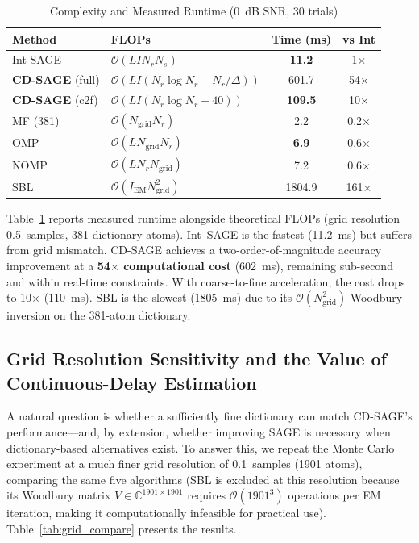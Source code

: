 \documentclass[a4paper,fleqn]{cas-dc}
\newcommand{\bigO}{\mathcal{O}}
\begin{document}
\begin{table}[width=.9\linewidth,cols=4,pos=h]
\centering
\caption{Complexity and Measured Runtime (0~dB SNR, 30 trials)}
\label{tab:complexity}
\footnotesize
\begin{tabular}{@{}l>{\raggedright\arraybackslash}p{2.9cm}cc@{}}
\toprule
Method & FLOPs & Time (ms) & vs Int \\
\midrule
Int SAGE & $\bigO(L I N_r N_s)$ & \textbf{11.2} & 1$\times$ \\
\textbf{CD-SAGE} (full) & $\bigO(L I (N_r \log N_r + N_r/\Delta))$ & 601.7 & 54$\times$ \\
\textbf{CD-SAGE} (c2f) & $\bigO(L I (N_r \log N_r + 40))$ & \textbf{109.5} & 10$\times$ \\
MF (381) & $\bigO(N_{\text{grid}} N_r)$ & 2.2 & 0.2$\times$ \\
OMP & $\bigO(L N_{\text{grid}} N_r)$ & \textbf{6.9} & 0.6$\times$ \\
NOMP & $\bigO(L N_r N_{\text{grid}})$ & 7.2 & 0.6$\times$ \\
SBL & $\bigO(I_{\text{EM}} N_{\text{grid}}^2)$ & 1804.9 & 161$\times$ \\
\bottomrule
\end{tabular}
\end{table}

Table~\ref{tab:complexity} reports measured runtime alongside theoretical FLOPs (grid resolution 0.5~samples, 381 dictionary atoms). Int~SAGE is the fastest (\SI{11.2}{ms}) but suffers from grid mismatch. CD-SAGE achieves a two-order-of-magnitude accuracy improvement at a \textbf{54$\times$ computational cost} (\SI{602}{ms}), remaining sub-second and within real-time constraints. With coarse-to-fine acceleration, the cost drops to 10$\times$ (\SI{110}{ms}). SBL is the slowest (\SI{1805}{ms}) due to its $\bigO(N_{\text{grid}}^2)$ Woodbury inversion on the 381-atom dictionary.

\subsection{Grid Resolution Sensitivity and the Value of Continuous-Delay Estimation}

A natural question is whether a sufficiently fine dictionary can match CD-SAGE's performance---and, by extension, whether improving SAGE is necessary when dictionary-based alternatives exist. To answer this, we repeat the Monte Carlo experiment at a much finer grid resolution of 0.1~samples (1901 atoms), comparing the same five algorithms (SBL is excluded at this resolution because its Woodbury matrix $V \in \mathbb{C}^{1901\times 1901}$ requires $\mathcal{O}(1901^3)$ operations per EM iteration, making it computationally infeasible for practical use). Table~\ref{tab:grid_compare} presents the results.
\end{document}
